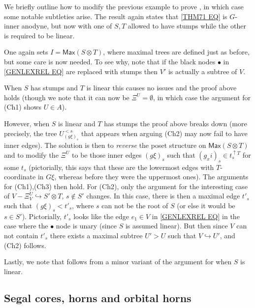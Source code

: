 \documentclass[a4paper,10pt
,draft
]{article}%
\begin{document}
 
\begin{remark}
We briefly outline how to modify the previous example to prove 
\cite[Thm 7.1(ii)]{Per17}, in which case some notable subtleties arise.
The result again states that \eqref{THM71 EQ} is $G$-inner anodyne, but now with one of $S,T$ allowed to have stumps while the other is required to be linear.

One again sets $I=\mathsf{Max}(S\otimes T)$, where maximal trees are defined just as before, but some care is now needed.
To see why, note that if the black nodes $\bullet$ in \eqref{GENLEXREL EQ} are replaced with stumps then $V'$
is actually a subtree of $V$.

When $S$ has stumps and $T$ is linear this causes no issues and the proof above holds
(though we note that it can now be 
$\Xi^U=\emptyset$, in which case the argument for (Ch1) shows $U\in A$).

However, when $S$ is linear and $T$ has stumps the proof above breaks down (more precisely, the tree $U_{(g\xi)_s}^{<s}$ that appears when arguing (Ch2) may now fail to have inner edges). The solution is then to \textit{reverse} the poset structure on 
$\mathsf{Max}(S\otimes T)$
and to modify the $\Xi^U$ to be those inner edges $(g \xi)_s$ such that
$(g _xi)_s \in t_s^{\uparrow T}$ for some $t_s$
(pictorially, this says that these are the lowermost edges with $T$-coordinate in $G\xi$, whereas before they were the uppermost ones). The arguments for (Ch1),(Ch3) then hold.
For (Ch2), only the argument for the interesting case of
$V- \Xi_V^U \hookrightarrow S' \otimes T$, $s \not \in S'$
changes. In this case, there is then a maximal edge $t'_s$ such that $(g \xi)_s < t'_s$, where $s$ can not be the root of $S$ (or else it would be $s \in S'$). Pictorially, $t'_s$ looks like the edge $e_1 \in V$ in \eqref{GENLEXREL EQ} in the case where the $\bullet$ node is unary (since $S$ is assumed linear). But then since $V$ can not contain $t'_s$ there exists a maximal subtree $U' > U$ such that $V \hookrightarrow U'$,
and (Ch2) follows.

Lastly, we note that \cite[Thm. 7.2]{Per17} follows from a minor variant of the argument for \cite[Thm. 7.1(ii)]{Per17} when $S$ is linear.
\end{remark}



\subsection{Segal cores, horns and orbital horns}\label{HYPERSAT SEC}
\end{document}
